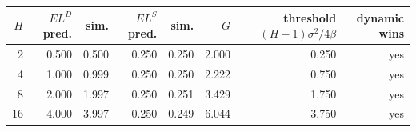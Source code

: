 \begin{tabular}{rrrrrrrr}
\toprule
$H$ & $E L^D$ pred. & sim. & $E L^S$ pred. & sim. & $G$ & threshold $(H\!-\!1)\sigma^2/4\beta$ & dynamic wins \\
\midrule
2 & 0.500 & 0.500 & 0.250 & 0.250 & 2.000 & 0.250 & yes \\
4 & 1.000 & 0.999 & 0.250 & 0.250 & 2.222 & 0.750 & yes \\
8 & 2.000 & 1.997 & 0.250 & 0.251 & 3.429 & 1.750 & yes \\
16 & 4.000 & 3.997 & 0.250 & 0.249 & 6.044 & 3.750 & yes \\
\bottomrule
\end{tabular}
